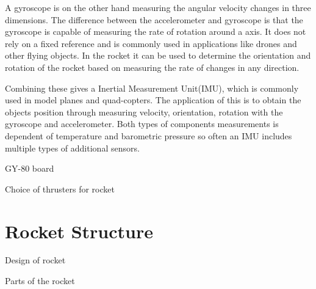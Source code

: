 A gyroscope is on the other hand measuring the angular velocity changes in three dimensions. The difference between the accelerometer and gyroscope is that the gyroscope is capable of measuring the rate of rotation around a axis. It does not rely on a fixed reference and is commonly used in applications like drones and other flying objects. In the rocket it can be used to determine the orientation and rotation of the rocket based on measuring the rate of changes in any direction.  


Combining these gives a Inertial Measurement Unit(IMU), which is commonly used in model planes and quad-copters. The application of this is to obtain the objects position through measuring velocity, orientation, rotation with the gyroscope and accelerometer. Both types of components measurements is dependent of temperature and barometric pressure so often an IMU includes multiple types of additional sensors. 	  



GY-80 board 



Choice of thrusters for rocket

\section{Rocket Structure}
Design of rocket

Parts of the rocket 


